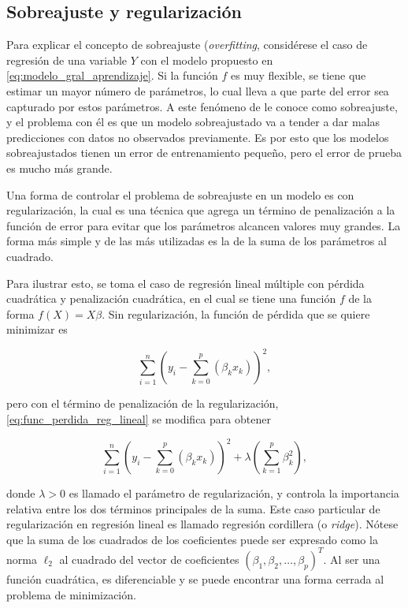 \subsection{Sobreajuste y regularización}

Para explicar el concepto de sobreajuste (\textit{overfitting}, considérese el caso de regresión de una variable $Y$ con el modelo propuesto en \ref{eq:modelo_gral_aprendizaje}. Si la función $f$ es muy flexible, se tiene que estimar un mayor número de parámetros, lo cual lleva a que parte del error sea capturado por estos parámetros. A este fenómeno de le conoce como sobreajuste, y el problema con él es que un modelo sobreajustado va a tender a dar malas predicciones con datos no observados previamente. Es por esto que los modelos sobreajustados tienen un error de entrenamiento pequeño, pero el error de prueba es mucho más grande.

Una forma de controlar el problema de sobreajuste en un modelo es con regularización, la cual es una técnica que agrega un término de penalización a la función de error para evitar que los parámetros alcancen valores muy grandes. La forma más simple y de las más utilizadas es la de la suma de los parámetros al cuadrado. 

Para ilustrar esto, se toma el caso de regresión lineal múltiple con pérdida cuadrática y penalización cuadrática, en el cual se tiene una función $f$ de la forma $f(X) = X \beta$. Sin regularización, la función de pérdida que se quiere minimizar es

\begin{equation}
  \label{eq:func_perdida_reg_lineal}
  \sum_{i = 1}^n{ \left( y_i - \sum_{k = 0}^p \left( \beta_k x_k \right) \right) ^ 2},
\end{equation}

pero con el término de penalización de la regularización, \ref{eq:func_perdida_reg_lineal} se modifica para obtener

\begin{equation}
  \label{eq:func_perdida_reg_lineal_reg}
  \sum_{i = 1}^n{ \left( y_i - \sum_{k = 0}^p \left( \beta_k x_k \right) \right) ^ 2} 
  + \lambda \left( \sum_{k = 1}^p \beta_k^2 \right),
\end{equation}

donde $\lambda > 0$ es llamado el parámetro de regularización, y controla la importancia relativa entre los dos términos principales de la suma. Este caso particular de regularización en regresión lineal es llamado regresión cordillera (o \textit{ridge}). Nótese que la suma de los cuadrados de los coeficientes puede ser expresado como la norma $\ell_2$ al cuadrado del vector de coeficientes $\left( \beta_1, \beta_2, \hdots, \beta_p \right)^T$. Al ser una función cuadrática, es diferenciable y se puede encontrar una forma cerrada al problema de minimización.

